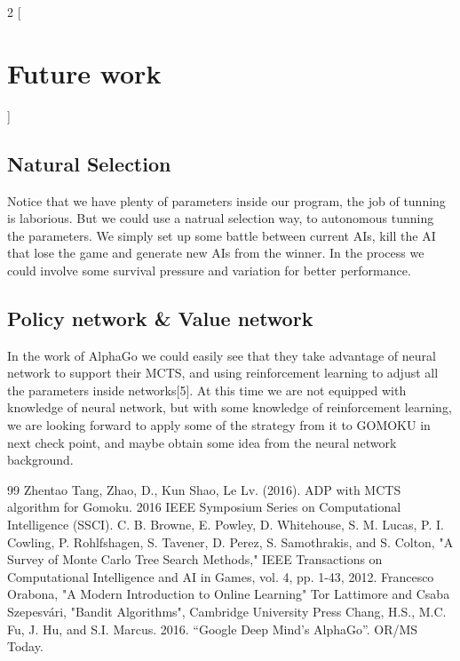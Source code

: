 \documentclass[a4paper, 11pt]{article} %
\begin{document}
	\begin{multicols}{2}
		[
		\section{Future work}
		]
		
		\subsection{Natural Selection}
		
		Notice that we have plenty of parameters inside our program, the job of tunning is laborious. But we could use a natrual selection way, to autonomous tunning the parameters. We simply set up some battle between current AIs, kill the AI that lose the game and generate new AIs from the winner. In the process we could involve some survival pressure and variation for better performance.
		
		\subsection{Policy network \& Value network}
		
		In the work of AlphaGo we could easily see that they take advantage of neural network to support their MCTS, and using reinforcement learning to adjust all the parameters inside networks[5]. At this time we are not equipped with knowledge of neural network, but with some knowledge of reinforcement learning, we are looking forward to apply some of the strategy from it to GOMOKU in next check point, and maybe obtain some idea from the neural network background.
		
	\end{multicols}

	\begin{thebibliography}{99}
		 Zhentao Tang, Zhao, D., Kun Shao, Le Lv. (2016). ADP with MCTS algorithm for Gomoku. 2016 IEEE Symposium Series on Computational Intelligence (SSCI).
		 C. B. Browne, E. Powley, D. Whitehouse, S. M. Lucas, P. I. Cowling, P. Rohlfshagen, S. Tavener, D. Perez, S. Samothrakis, and S. Colton, "A Survey of Monte Carlo Tree Search Methods," IEEE Transactions on Computational Intelligence and AI in Games, vol. 4, pp. 1-43, 2012.
		 Francesco Orabona, "A Modern Introduction to Online Learning"
		 Tor Lattimore and Csaba Szepesvári, "Bandit Algorithms", Cambridge University Press
		 Chang, H.S., M.C. Fu, J. Hu, and S.I. Marcus. 2016. “Google Deep Mind’s AlphaGo”. OR/MS Today.
	\end{thebibliography}
	
	
	
	
\end{document}
